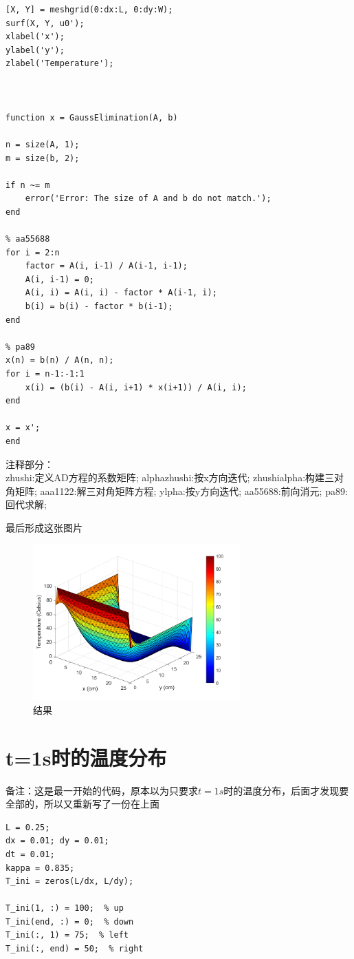 \documentclass[12pt, a4paper, oneside]{ctexart}
\begin{document}
\begin{spacing}{2.0}
\begin{lstlisting}
[X, Y] = meshgrid(0:dx:L, 0:dy:W);
surf(X, Y, u0');
xlabel('x');
ylabel('y');
zlabel('Temperature');



function x = GaussElimination(A, b)

n = size(A, 1);
m = size(b, 2);

if n ~= m
    error('Error: The size of A and b do not match.');
end

% aa55688
for i = 2:n
    factor = A(i, i-1) / A(i-1, i-1);
    A(i, i-1) = 0;
    A(i, i) = A(i, i) - factor * A(i-1, i);
    b(i) = b(i) - factor * b(i-1);
end

% pa89
x(n) = b(n) / A(n, n);
for i = n-1:-1:1
    x(i) = (b(i) - A(i, i+1) * x(i+1)) / A(i, i);
end

x = x';
end
\end{lstlisting}
注释部分：\\
zhushi:定义AD方程的系数矩阵;
alphazhushi:按x方向迭代;
zhushialpha:构建三对角矩阵;
aaa1122:解三对角矩阵方程;
ylpha:按y方向迭代;
aa55688:前向消元;
pa89:回代求解;



最后形成这张图片
\begin{figure}[htbp][H]
    \centering
    \includegraphics[width=8cm]{frame_1.png}
    \caption{结果}
\end{figure}

\section{t=1s时的温度分布}
备注：这是最一开始的代码，原本以为只要求$t=1s$时的温度分布，后面才发现要全部的，所以又重新写了一份在上面
\begin{lstlisting}
L = 0.25; 
dx = 0.01; dy = 0.01;  
dt = 0.01; 
kappa = 0.835; 
T_ini = zeros(L/dx, L/dy); 

T_ini(1, :) = 100;  % up
T_ini(end, :) = 0;  % down
T_ini(:, 1) = 75;  % left
T_ini(:, end) = 50;  % right



\end{lstlisting}
\end{spacing}
\end{document}
